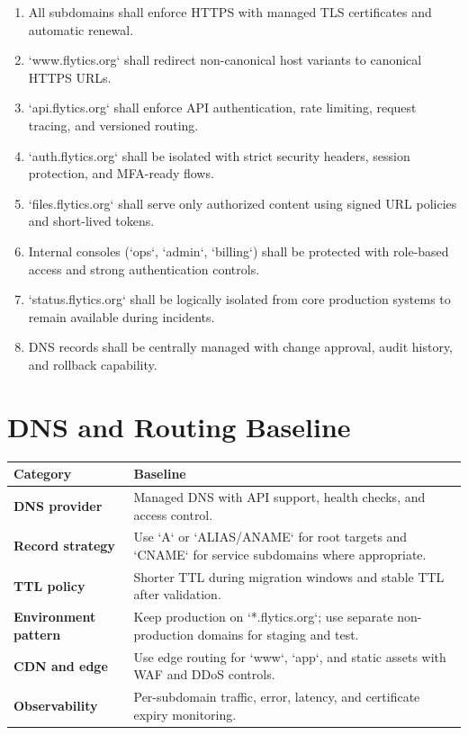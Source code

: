 \documentclass[11pt,a4paper]{article}
\begin{document}
\begin{enumerate}[leftmargin=*]
    \item All subdomains shall enforce HTTPS with managed TLS certificates and automatic renewal.
    \item `www.flytics.org` shall redirect non-canonical host variants to canonical HTTPS URLs.
    \item `api.flytics.org` shall enforce API authentication, rate limiting, request tracing, and versioned routing.
    \item `auth.flytics.org` shall be isolated with strict security headers, session protection, and MFA-ready flows.
    \item `files.flytics.org` shall serve only authorized content using signed URL policies and short-lived tokens.
    \item Internal consoles (`ops`, `admin`, `billing`) shall be protected with role-based access and strong authentication controls.
    \item `status.flytics.org` shall be logically isolated from core production systems to remain available during incidents.
    \item DNS records shall be centrally managed with change approval, audit history, and rollback capability.
\end{enumerate}

\section{DNS and Routing Baseline}

\begin{longtable}{>{\bfseries}p{}p{}}
\toprule
Category & Baseline \\
\midrule
DNS provider & Managed DNS with API support, health checks, and access control. \\
Record strategy & Use `A` or `ALIAS/ANAME` for root targets and `CNAME` for service subdomains where appropriate. \\
TTL policy & Shorter TTL during migration windows and stable TTL after validation. \\
Environment pattern & Keep production on `*.flytics.org`; use separate non-production domains for staging and test. \\
CDN and edge & Use edge routing for `www`, `app`, and static assets with WAF and DDoS controls. \\
Observability & Per-subdomain traffic, error, latency, and certificate expiry monitoring. \\
\bottomrule
\end{longtable}
\end{document}
